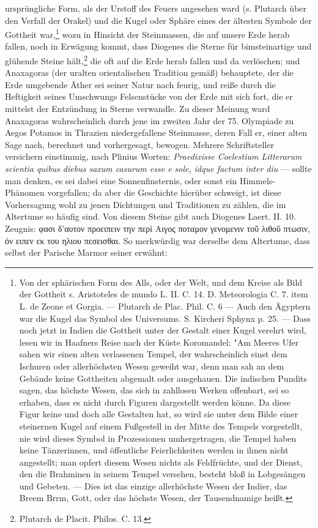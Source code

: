 \documentclass[a4paper, 11pt, oneside, polutonikogreek, german]{article}
\begin{document}
ursprüngliche Form, als der Urstoff des Feuers angesehen ward (s. Plutarch über den Verfall der Orakel) und die Kugel oder Sphäre eines der ältesten Symbole der Gottheit war,\footnote{Von der sphärischen Form des Alls, oder der Welt, und dem Kreise als Bild der Gottheit s. Aristoteles de mundo L. II. C. 14. D. Meteorologia C. 7. item L. de Zeone et Gorgia. --- Plutarch de Plac. Phil. C. 6 --- Auch den Ägyptern war die Kugel das Symbol des Universums. S. Kircheri Sphynx p. 25. --- Dass noch jetzt in Indien die Gottheit unter der Gestalt einer Kugel verehrt wird, lesen wir in Haafners Reise nach der Küste Koromandel:
\hspace*{0.5cm} "Am Meeres Ufer sahen wir einen alten verlassenen Tempel, der wahrscheinlich einst dem Ischuren oder allerhöchsten Wesen geweiht war, denn man sah an dem Gebäude keine Gottheiten abgemalt oder ausgehauen. Die indischen Pundits sagen, das höchste Wesen, das sich in zahllosen Werken offenbart, sei so erhaben, dass es nicht durch Figuren dargestellt werden könne. Da diese Figur keine und doch alle Gestalten hat, so wird sie unter dem Bilde einer steinernen Kugel auf einem Fußgestell in der Mitte des Tempels vorgestellt, nie wird dieses Symbol in Prozessionen umhergetragen, die Tempel haben keine Tänzerinnen, und öffentliche Feierlichkeiten werden in ihnen nicht angestellt; man opfert diesem Wesen nichts als Feldfrüchte, und der Dienst, den die Brahminen in seinem Tempel versehen, besteht bloß in Lobgesängen und Gebeten. --- Dies ist das einzige allerhöchste Wesen der Indier, das Breem Brrm, Gott, oder das höchste Wesen, der Tausendnamige heißt.} wozu in Hinsicht der Steinmassen, die auf unsere Erde herab fallen, noch in Erwägung kommt, dass Diogenes die Sterne für bimsteinartige und glühende Steine hält,\footnote{Plutarch de Placit. Philos. C. 13.} die oft auf die Erde herab fallen und da verlöschen; und Anaxagoras (der uralten orientalischen Tradition gemäß) behauptete, der die Erde umgebende Äther sei seiner Natur nach feurig, und reiße durch die Heftigkeit seines Umschwungs Felsenstücke von der Erde mit sich fort, die er mittelst der Entzündung in Sterne verwandle. Zu dieser Meinung ward Anaxagoras wahrscheinlich durch jene im zweiten Jahr der 75. Olympiade zu Aegos Potamos in Thrazien niedergefallene Steinmasse, deren Fall er, einer alten Sage nach, berechnet und vorhergesagt, bewogen. Mehrere Schriftsteller versichern einstimmig, nach Plinius Worten: \emph{Praedixisse Coelestium Litterarum scientia quibus diebus saxum casurum esse e sole, idque factum inter diu} --- sollte man denken, es sei dabei eine Sonnenfinsternis, oder sonst ein Himmels-Phänomen vorgefallen; da aber die Geschichte hierüber schweigt, ist diese Vorhersagung wohl zu jenen Dichtungen und Traditionen zu zählen, die im Altertume so häufig sind. Von diesem Steine gibt auch Diogenes Laert. II. 10. Zeugnis: φασι δ'αυτον προειπειν την περἰ Αιγος ποταμον γενομενιν τοῦ λιθοῦ πτωσιν, ὀν ειπεν εκ του ηλιου πεσεισθαι. So merkwürdig war derselbe dem Altertume, dass selbst der Parische Marmor seiner erwähnt:
\end{document}
